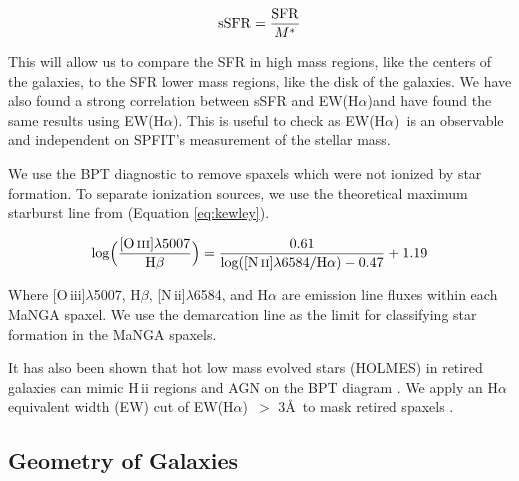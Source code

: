 \documentclass[iop,revtex4,twocolumn,apj,numberedappendix,appendixfloats]{emulateapj}
\newcommand{\OIII}{[O\,{\sc iii}]}
\newcommand{\NII}{[N\,{\sc ii}]}
\newcommand{\ewha}{EW(H$\alpha$)}
\begin{document}
\begin{equation}
{\rm sSFR} = \frac{\rm SFR}{M^*}
\end{equation}

This will allow us to compare the SFR in high mass regions, like the centers of the galaxies, to the SFR lower mass regions, like the disk of the galaxies. We have also found a strong correlation between sSFR and \ewha and have found the same results using \ewha. This is useful to check as \ewha\ is an observable and independent on {\sc SPFIT}'s measurement of the stellar mass. 

We use the BPT diagnostic \citep{Baldwin:1981} to remove spaxels which were not ionized by star formation. To separate ionization sources, we use the theoretical maximum starburst line from \citet{Kewley:2001} (Equation \ref{eq:kewley}).

\begin{equation}\label{eq:kewley}
\rm{log\Big(\frac{[O\,\textsc{iii}]\lambda 5007}{H\beta}\Big) = \frac{0.61}{log([N\,\textsc{ii}]\lambda 6584 / H\alpha) - 0.47} + 1.19}
\end{equation}

Where \OIII$\lambda$5007, H$\beta$, \NII$\lambda$6584, and H$\alpha$ are emission line fluxes within each MaNGA spaxel. We use the \citet{Kewley:2001} demarcation line as the limit for classifying star formation in the MaNGA spaxels. 

It has also been shown that hot low mass evolved stars (HOLMES) in retired galaxies can mimic H\,{\sc ii} regions and AGN on the BPT diagram \citep{Stasinska:2008}. We apply an H$\alpha$ equivalent width (EW) cut of \ewha\ $>$ 3\AA\ to mask retired spaxels \citep{Cid-Fernandes:2011}. 

 

\subsection{Geometry of Galaxies}\label{sec:radial}
\end{document}
